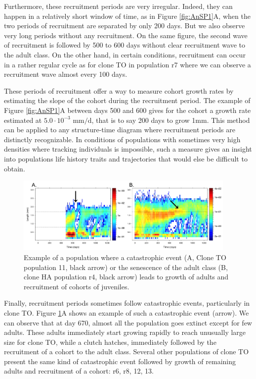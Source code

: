 Furthermore, these recruitment periods are very irregular. Indeed, they can
happen in a relatively short window of time, as in Figure \ref{fig:AnSP1}A, when the two
periods of recruitment are separated by only 200 days. But we also observe very
long periods without any recruitment. On the same figure, the second wave of
recruitment is followed by 500 to 600 days without clear recruitment wave to the
adult class. On the other hand, in certain conditions, recruitment can occur in
a rather regular cycle as for clone TO in population r7 where we can observe a
recruitment wave almost every 100 days.

These periods of recruitment offer a way to measure cohort growth rates by
estimating the slope of the cohort during the recruitment period. The example of
Figure \ref{fig:AnSP1}A between days 500 and 600 gives for the cohort a growth rate estimated
at $5.0\cdot 10^{-3}$ mm$/$d, that is to say 200 days to grow 1mm. This method
can be applied to any structure-time diagram where recruitment periods are distinctly
recognizable. In conditions of populations with sometimes very high densities
where tracking individuals is impossible, such a measure gives an insight into
populations life history traits and trajectories that would else be difficult to
obtain.

\begin{figure}[!ht]
\begin{center}
\includegraphics[width=0.95\textwidth]{3-1_ChapExp1/Fig/AnnSP2}
\caption[Examples of a population's
structure]{Example of a population where a catastrophic event (A, Clone TO
population 11, black arrow) or the senescence of the adult class (B, clone HA
population r4, black arrow) leads to growth of adults and recruitment of cohorts
of juveniles.}
\label{fig:AnSP2}
\end{center}
\end{figure}

Finally, recruitment periods sometimes follow catastrophic events, particularly
in clone TO. Figure \ref{fig:AnSP2}A shows an example of such a catastrophic
event (arrow).
We can observe that at day 670, almost all the population goes extinct except for
few adults. These adults immediately start growing rapidly to reach unusually
large size for clone TO, while a clutch hatches, immediately followed by the
recruitment of a cohort to the adult class. Several other populations of clone
TO present the same kind of catastrophic event followed by growth of remaining
adults and recruitment of a cohort: r6, r8, 12, 13.

